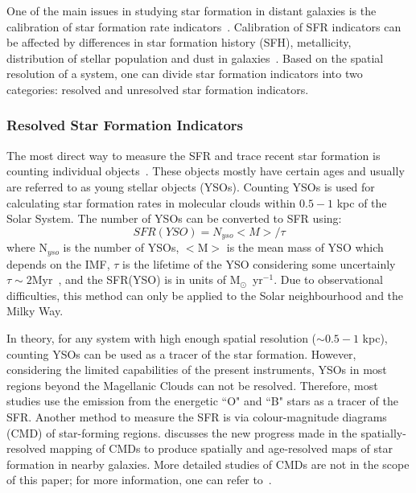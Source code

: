 One of the main issues in studying star formation in distant galaxies is the calibration of star formation rate indicators~\citep[e.g.,][]{Lee10}. 
Calibration of SFR indicators can be affected by differences in star formation history (SFH), metallicity, distribution of stellar population and dust in galaxies~\citep{Calzetti13}. 
Based on the spatial resolution of a system, one can divide star formation indicators into two categories: resolved and unresolved star formation indicators.

\subsubsection{Resolved Star Formation Indicators}
The most direct way to measure the SFR and trace recent star formation is counting individual objects~\citep{Kennicutt12}. 
These objects mostly have certain ages and usually are referred to as young stellar objects (YSOs). %
Counting YSOs is used for calculating star formation rates in molecular clouds within $0.5- 1$ kpc of the Solar System. 
The number of YSOs can be converted to SFR using: 
\begin{equation}
SFR(YSO) = N_{yso} <M>/\tau 
\end{equation}
where N$_{yso}$ is the number of YSOs, $<$M$>$ is the mean mass of YSO which depends on the IMF, 
$\tau$ is the lifetime of the YSO considering some uncertainly $\tau \sim 2$Myr~\citep{Evans09}, and the SFR(YSO) is in units of M$_{\odot}$~yr$^{-1}$. 
Due to observational difficulties, this method can only be applied to the Solar neighbourhood and the Milky Way. %

In theory, for any system with high enough spatial resolution ($\sim 0.5- 1$ kpc), counting YSOs can be used as a tracer of the star formation. %
However, considering the limited capabilities of the present instruments, YSOs in most regions beyond the Magellanic Clouds can not be resolved. %
Therefore, most studies use the emission from the energetic ``O" and ``B" stars as a tracer of the SFR. %
Another method to measure the SFR is via colour-magnitude diagrams (CMD) of star-forming regions. 
\cite{Kennicutt12} discusses the new progress made in the spatially-resolved mapping of CMDs to produce spatially and age-resolved maps of star formation in nearby galaxies. 
More detailed studies of CMDs are not in the scope of this paper; for more information, one can refer to~\citep{Kennicutt12}. %

